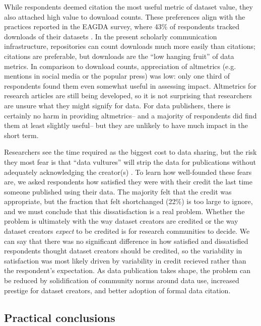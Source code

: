 \documentclass[10pt]{article}
\begin{document}
While respondents deemed citation the most useful metric of dataset value, they also attached high value to download counts.
These preferences align with the practices reported in the EAGDA survey, where 43\% of respondents tracked downloads of their datasets \cite{bobrow_establishing_2014}.
In the present scholarly communication infrastructure, repositories can count downloads much more easily than citations; citations are preferable, but downloads are the ``low hanging fruit'' of data metrics.
In comparison to download counts, appreciation of altmetrics (e.g. mentions in social media or the popular press) was low: only one third of respondents found them even somewhat useful in assessing impact.
Altmetrics for research articles are still being developed, so it is not surprising that researchers are unsure what they might signify for data.
For data publishers, there is certainly no harm in providing altmetrics-- and a majority of respondents did find them at least slightly useful-- but they are unlikely to have much impact in the short term.

Researchers see the time required as the biggest cost to data sharing, but the risk they most fear is that ``data vultures'' will strip the data for publications without adequately acknowledging the creator(s) \cite{kim_institutional_2012}.
To learn how well-founded these fears are, we asked respondents how satisfied they were with their credit the last time someone published using their data.
The majority felt that the credit was appropriate, but the fraction that felt shortchanged (22\%) is too large to ignore, and we must conclude that this dissatisfaction is a real problem.
Whether the problem is ultimately with the way dataset creators are credited or the way dataset creators \textit{expect} to be credited is for research communities to decide.
We can say that there was no significant difference in how satisfied and dissatisfied respondents thought dataset creators should be credited, so the variability in satisfaction was most likely driven by variability in credit recieved rather than the respondent's expectation.
As data publication takes shape, the problem can be reduced by solidification of community norms around data use, increased prestige for dataset creators, and better adoption of formal data citation.

\subsection*{Practical conclusions}
\end{document}
